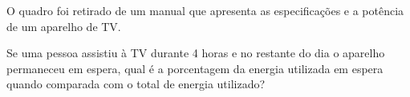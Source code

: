 O quadro foi retirado de um manual que apresenta as especificações e a potência de um aparelho de TV.\par
{}
Se uma pessoa assistiu à TV durante 4 horas e no restante do dia o aparelho permaneceu em espera, qual é a porcentagem da energia utilizada em espera quando comparada com o total de energia utilizado?\par
\begin{altlinha}
%
%
%
%
\end{altlinha}
